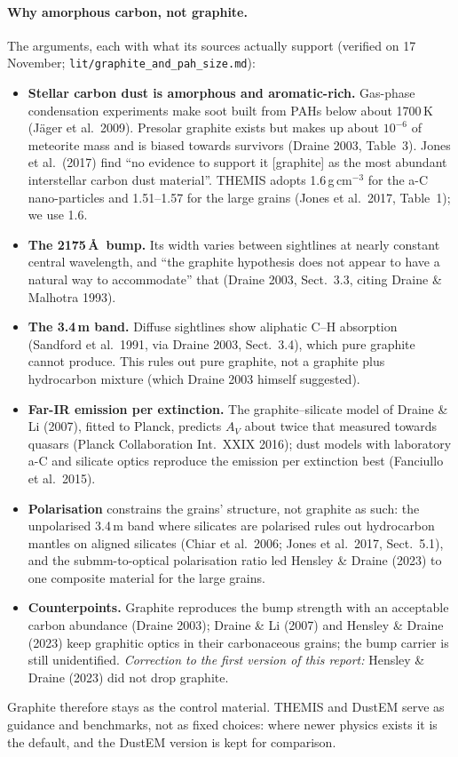 \documentclass[11pt,a4paper]{article}
\begin{document}
\paragraph{Why amorphous carbon, not graphite.} The arguments, each with what its sources actually support
(verified on 17 November; \texttt{lit/graphite\_and\_pah\_size.md}):
\begin{itemize}
\item \textbf{Stellar carbon dust is amorphous and aromatic-rich.} Gas-phase condensation experiments make soot built
  from PAHs below about 1700\,K (J\"ager et al.\ 2009). Presolar graphite exists but makes up about $10^{-6}$ of
  meteorite mass and is biased towards survivors (Draine 2003, Table~3). Jones et al.\ (2017) find ``no evidence to
  support it [graphite] as the most abundant interstellar carbon dust material''. THEMIS adopts 1.6\,g\,cm$^{-3}$ for
  the a-C nano-particles and 1.51--1.57 for the large grains (Jones et al.\ 2017, Table~1); we use 1.6.
\item \textbf{The 2175\,\AA\ bump.} Its width varies between sightlines at nearly constant central wavelength, and
  ``the graphite hypothesis does not appear to have a natural way to accommodate'' that (Draine 2003, Sect.~3.3,
  citing Draine \& Malhotra 1993).
\item \textbf{The 3.4\,\textmu m band.} Diffuse sightlines show aliphatic C--H absorption (Sandford et al.\ 1991, via
  Draine 2003, Sect.~3.4), which pure graphite cannot produce. This rules out pure graphite, not a graphite plus
  hydrocarbon mixture (which Draine 2003 himself suggested).
\item \textbf{Far-IR emission per extinction.} The graphite--silicate model of Draine \& Li (2007), fitted to Planck,
  predicts $A_V$ about twice that measured towards quasars (Planck Collaboration Int.\ XXIX 2016); dust models with
  laboratory a-C and silicate optics reproduce the emission per extinction best (Fanciullo et al.\ 2015).
\item \textbf{Polarisation} constrains the grains' structure, not graphite as such: the unpolarised 3.4\,\textmu m band
  where silicates are polarised rules out hydrocarbon mantles on aligned silicates (Chiar et al.\ 2006; Jones et al.\
  2017, Sect.~5.1), and the submm-to-optical polarisation ratio led Hensley \& Draine (2023) to one composite material
  for the large grains.
\item \textbf{Counterpoints.} Graphite reproduces the bump strength with an acceptable carbon abundance (Draine 2003);
  Draine \& Li (2007) and Hensley \& Draine (2023) keep graphitic optics in their carbonaceous grains; the bump carrier
  is still unidentified. \emph{Correction to the first version of this report:} Hensley \& Draine (2023) did not drop
  graphite.
\end{itemize}
Graphite therefore stays as the control material. THEMIS and DustEM serve as guidance and benchmarks, not as fixed
choices: where newer physics exists it is the default, and the DustEM version is kept for comparison.
\end{document}
